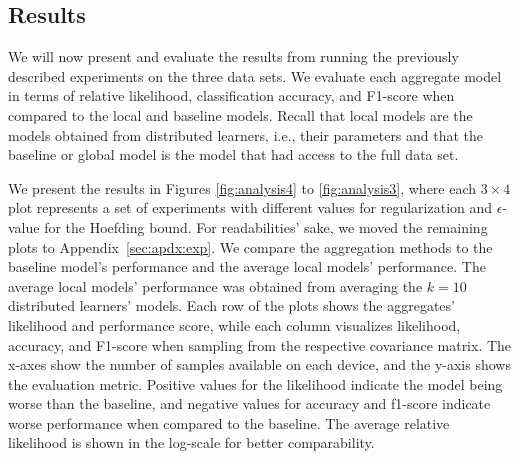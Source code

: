 \subsection{Results}
We will now present and evaluate the results from running the previously described experiments on the three data sets. 
We evaluate each aggregate model in terms of relative likelihood, classification accuracy, and F1-score when compared to the local and baseline models.
Recall that local models are the models obtained from distributed learners, i.e., their parameters and that the baseline or global model is the model that had access to the full data set.

We present the results in Figures \ref{fig:analysis4} to \ref{fig:analysis3}, where each $3\times4$ plot represents a set of experiments with different values for regularization and $\epsilon$-value for the Hoefding bound. 
For readabilities' sake, we moved the remaining plots to Appendix~\ref{sec:apdx:exp}.
We compare the aggregation methods to the baseline model's performance and the average local models' performance. 
The average local models' performance was obtained from averaging the $k=10$ distributed learners' models.
Each row of the plots shows the aggregates' likelihood and performance score, while each column visualizes likelihood, accuracy, and F1-score when sampling from the respective covariance matrix.
The x-axes show the number of samples available on each device, and the y-axis shows the evaluation metric.
Positive values for the likelihood indicate the model being worse than the baseline, and negative values for accuracy and f1-score indicate worse performance when compared to the baseline.
The average relative likelihood is shown in the log-scale for better comparability.


